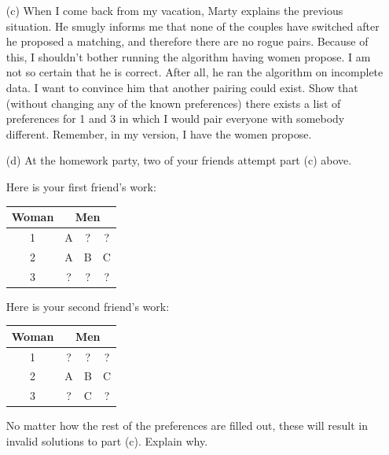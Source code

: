 \documentclass[11pt]{article}
\newif\ifsolutions
\begin{document}
\begin{qunlist}
\begin{itemize}
\ifsolutions
\textbf{Solutions:}
\fi


\item[(c)] When I come back from my vacation, Marty explains the previous situation. 
He smugly informs me that none of the couples have switched after he proposed a matching, 
and therefore there are no rogue pairs. 
Because of this, I shouldn't bother running the algorithm having women propose. 
I am not so certain that he is correct. After all, he ran the algorithm on incomplete data. 
I want to convince him that another pairing could exist. 
Show that (without changing any of the known preferences) 
there exists a list of preferences for 1 and 3 in which I would pair everyone with somebody different. 
Remember, in my version, I have the women propose.

\ifsolutions
\textbf{Solutions:}
\fi


\item[(d)] At the homework party, two of your friends attempt part (c) above. 

Here is your first friend's work: 
\begin{center}
\begin{tabular}{|c|ccc|}\hline 
Woman&\multicolumn{3}{|c|}{Men}\\\hline 
1&A&?&?\\\hline 
2&A&B&C\\\hline 
3&?&?&?\\\hline
\end{tabular} 
\end{center}

Here is your second friend's work:
\begin{center}
\begin{tabular}{|c|ccc|}\hline 
Woman&\multicolumn{3}{|c|}{Men}\\\hline 
1&?&?&?\\\hline 
2&A&B&C\\\hline 
3&?&C&?\\\hline
\end{tabular}
\end{center}
 
No matter how the rest of the preferences are filled out, these will result in invalid solutions to part (c). 
Explain why.

\ifsolutions
\textbf{Solutions:}
\fi


\end{itemize} 
    




\end{qunlist}
\end{document}
